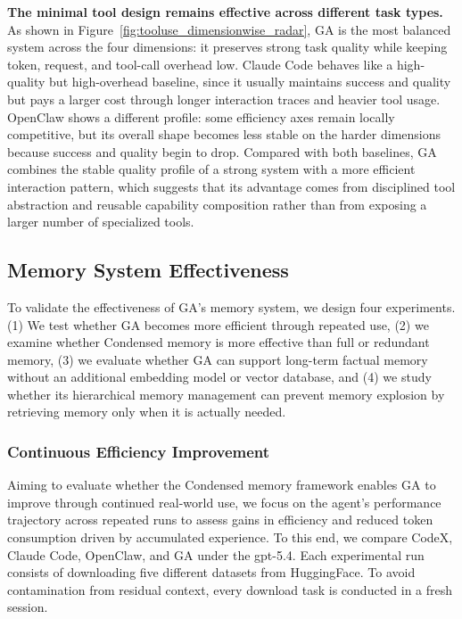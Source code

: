 \textbf{The minimal tool design remains effective across different task types.} As shown in Figure~\ref{fig:tooluse_dimensionwise_radar}, GA is the most balanced system across the four dimensions: it preserves strong task quality while keeping token, request, and tool-call overhead low. Claude Code behaves like a high-quality but high-overhead baseline, since it usually maintains success and quality but pays a larger cost through longer interaction traces and heavier tool usage. OpenClaw shows a different profile: some efficiency axes remain locally competitive, but its overall shape becomes less stable on the harder dimensions because success and quality begin to drop. Compared with both baselines, GA combines the stable quality profile of a strong system with a more efficient interaction pattern, which suggests that its advantage comes from disciplined tool abstraction and reusable capability composition rather than from exposing a larger number of specialized tools.

\subsection{Memory System Effectiveness}
\label{sec:exp_memory}

To validate the effectiveness of GA's memory system, we design four experiments. 
(1) We test whether GA becomes more efficient through repeated use, 
(2) we examine whether Condensed memory is more effective than full or redundant memory, 
(3) we evaluate whether GA can support long-term factual memory without an additional embedding model or vector database, and 
(4) we study whether its hierarchical memory management can prevent memory explosion by retrieving memory only when it is actually needed.

\subsubsection{Continuous Efficiency Improvement}
\label{sec:exp_continuous_efficiency}

Aiming to evaluate whether the Condensed memory framework enables GA to improve through continued real-world use, we focus on the agent’s performance trajectory across repeated runs to assess gains in efficiency and reduced token consumption driven by accumulated experience.
To this end, we compare CodeX, Claude Code, OpenClaw, and GA under the gpt-5.4. 
Each experimental run consists of downloading five different datasets from HuggingFace. 
To avoid contamination from residual context, every download task is conducted in a fresh session. 

